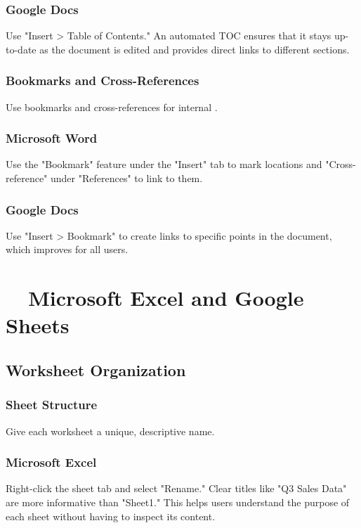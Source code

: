 \subsubsection{Google Docs}\label{ch15:sssec:docs-toc}
Use "Insert > Table of Contents." An automated TOC ensures that it stays up-to-date as the document is edited and provides direct links to different sections.

\subsubsection{Bookmarks and Cross-References}\label{ch15:sssec:bookmarks-cross-refs}
Use bookmarks and cross-references for internal .

\subsubsection{Microsoft Word}\label{ch15:sssec:word-bookmarks}
Use the "Bookmark" feature under the "Insert" tab to mark locations and "Cross-reference" under "References" to link to them.

\subsubsection{Google Docs}\label{ch15:sssec:docs-bookmarks}
Use "Insert > Bookmark" to create links to specific points in the document, which improves  for all users.

\section{~~Microsoft Excel and Google Sheets}\label{ch15:sec:excel-sheets}

\subsection{Worksheet Organization}\label{ch15:ssec:worksheet-org}

\subsubsection{Sheet Structure}\label{ch15:sssec:sheet-structure}
Give each worksheet a unique, descriptive name.

\subsubsection{Microsoft Excel}\label{ch15:sssec:excel-sheet-structure}
Right-click the sheet tab and select "Rename." Clear titles like "Q3 Sales Data" are more informative than "Sheet1." This helps users understand the purpose of each sheet without having to inspect its content.

